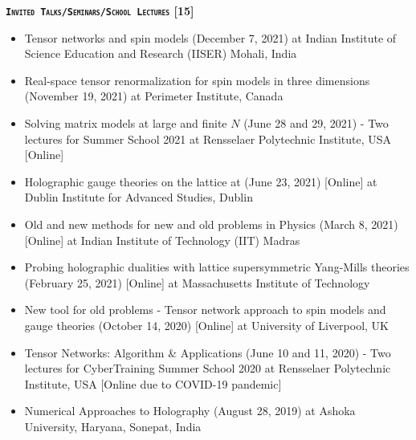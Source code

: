 \renewcommand\ttdefault{cmvtt}
\textcolor{alizarin}{\textbf{\textsc{\fontsize{12}{48} \bfseries \texttt{Invited Talks/Seminars/School Lectures} [15]}}}

\begin{itemize}
 \item Tensor networks and spin models 
 (December 7, 2021) at Indian Institute of Science Education and Research (IISER) Mohali, India 
 \href{https://rgjha.github.io/talks/IISERM_071221.pdf}{{\texttt{}}} 
  \item Real-space tensor renormalization for spin models in three dimensions 
 (November 19, 2021) at Perimeter Institute, Canada
 \item Solving matrix models at large and finite $N$ (June 28 and 29, 2021) - Two lectures for 
Summer School 2021 at Rensselaer Polytechnic Institute, USA [Online] 
 \href{https://rgjha.github.io/talks/RPI_2021_Lec1_2.pdf}{{\texttt{\COL{[Lecture 1 \& 2]}}}}  
 \item Holographic gauge theories on the lattice at 
 (June 23, 2021) [Online] at Dublin Institute for Advanced Studies, Dublin
 \href{https://rgjha.github.io/talks/DIAS_230621.pdf}{{\texttt{}}} 
  \href{https://youtu.be/JzeWm-ykDPk}{{\texttt{}}}
 \item Old and new methods for new and old problems in Physics
 (March 8, 2021) [Online] at Indian Institute of Technology (IIT) Madras
 \href{https://rgjha.github.io/talks/Collo_IITM.pdf}{{\texttt{}}} 
 \item Probing holographic dualities with lattice supersymmetric Yang-Mills theories 
 (February 25, 2021) [Online] at Massachusetts Institute of Technology
 \href{https://rgjha.github.io/talks/MIT_v2.pdf}{{\texttt{}}} 
 \href{http://y2u.be/fO8A18uwYIM}{{\texttt{}}}
 \item New tool for old problems - Tensor network approach to spin models and gauge theories 
 (October 14, 2020) [Online] at University of Liverpool, UK
 \href{https://rgjha.github.io/talks/Seminar_v2.pdf}{{\texttt{}}} 
 \item Tensor Networks: Algorithm \& Applications (June 10 and 11, 2020) - Two lectures for 
 CyberTraining Summer School 2020 at Rensselaer Polytechnic Institute, USA [Online due to COVID-19 pandemic] 
 \href{https://rgjha.github.io/talks/cs2020.pdf}{{\texttt{\COL{[Lecture 1 \& 2]}}}} 
 \item Numerical Approaches to Holography (August 28, 2019) at Ashoka University, Haryana, Sonepat, India

\end{itemize}
